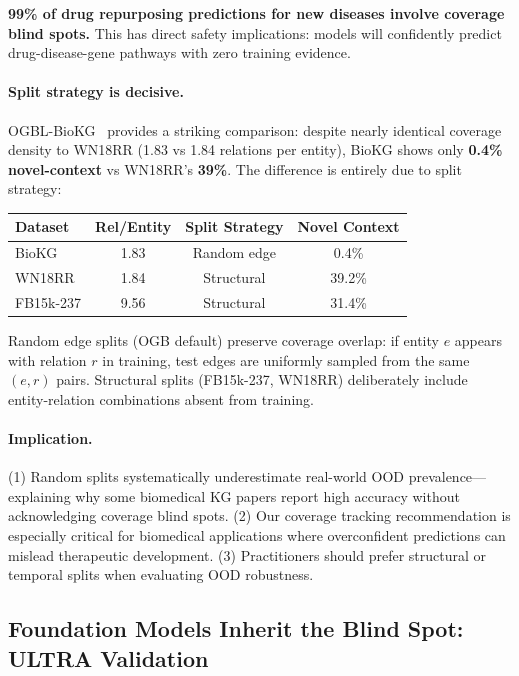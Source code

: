 \textbf{99\% of drug repurposing predictions for new diseases involve coverage blind spots.} This has direct safety implications: models will confidently predict drug-disease-gene pathways with zero training evidence.

\paragraph{Split strategy is decisive.}
OGBL-BioKG~\citep{hu2020open} provides a striking comparison: despite nearly identical coverage density to WN18RR (1.83 vs 1.84 relations per entity), BioKG shows only \textbf{0.4\% novel-context} vs WN18RR's \textbf{39\%}. The difference is entirely due to split strategy:

\begin{center}
\small
\begin{tabular}{lccc}
\toprule
Dataset & Rel/Entity & Split Strategy & Novel Context \\
\midrule
BioKG & 1.83 & Random edge & 0.4\% \\
WN18RR & 1.84 & Structural & 39.2\% \\
FB15k-237 & 9.56 & Structural & 31.4\% \\
\bottomrule
\end{tabular}
\end{center}

Random edge splits (OGB default) preserve coverage overlap: if entity $e$ appears with relation $r$ in training, test edges are uniformly sampled from the same $(e,r)$ pairs. Structural splits (FB15k-237, WN18RR) deliberately include entity-relation combinations absent from training.

\paragraph{Implication.}
(1) Random splits systematically underestimate real-world OOD prevalence---explaining why some biomedical KG papers report high accuracy without acknowledging coverage blind spots. (2) Our coverage tracking recommendation is especially critical for biomedical applications where overconfident predictions can mislead therapeutic development. (3) Practitioners should prefer structural or temporal splits when evaluating OOD robustness.

\subsection{Foundation Models Inherit the Blind Spot: ULTRA Validation}
\label{sec:ultra}

